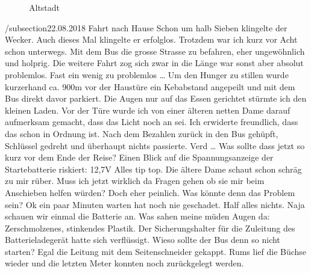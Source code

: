 \begin{figure}[H]
   \centering
   \quad
   \quad
   \caption[Altstadt]{Altstadt}
\end{figure}

\newpage

/subsection{22.08.2018 Fahrt nach Hause}
Schon um halb Sieben klingelte der Wecker.
Auch dieses Mal klingelte er erfolglos.
Trotzdem war ich kurz vor Acht schon unterwegs.
Mit dem Bus die grosse Strasse zu befahren, eher ungewöhnlich und holprig.
Die weitere Fahrt zog sich zwar in die Länge war sonst aber absolut problemlos.
Fast ein wenig zu problemlos \dots
Um den Hunger zu stillen wurde kurzerhand ca. 900m vor der Haustüre ein Kebabstand angepeilt und mit dem Bus direkt davor parkiert.
Die Augen nur auf das Essen gerichtet stürmte ich den kleinen Laden.
Vor der Türe wurde ich von einer älteren netten Dame darauf aufmerksam gemacht, dass das Licht noch an sei.
Ich erwiderte freundlich, dass das schon in Ordnung ist.
Nach dem Bezahlen zurück in den Bus gehüpft, Schlüssel gedreht und überhaupt nichts passierte.
Verd \dots
Was sollte dass jetzt so kurz vor dem Ende der Reise?
Einen Blick auf die Spannungsanzeige der Startebatterie riskiert: 12,7V
Alles tip top.
Die ältere Dame schaut schon schräg zu mir rüber.
Muss ich jetzt wirklich da Fragen gehen ob sie mir beim Anschieben helfen würden?
Doch eher peinlich.
Was könnte denn das Problem sein?
Ok ein paar Minuten warten hat noch nie geschadet.
Half alles nichts.
Naja schauen wir einmal die Batterie an.
Was sahen meine müden Augen da:
Zerschmolzenes, stinkendes Plastik.
Der Sicherungshalter für die Zuleitung des Batterieladegerät hatte sich verflüssigt.
Wieso sollte der Bus denn so nicht starten?
Egal die Leitung mit dem Seitenschneider gekappt.
Rums lief die Büchse wieder und die letzten Meter konnten noch zurückgelegt werden.

